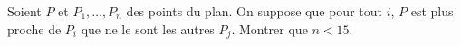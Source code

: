 Soient $P$ et $P_1, \ldots, P_n$ des points du plan. On suppose que pour tout $i$, $P$ est plus proche de $P_i$ que ne le sont les autres $P_j$. Montrer que $n < 15$.
